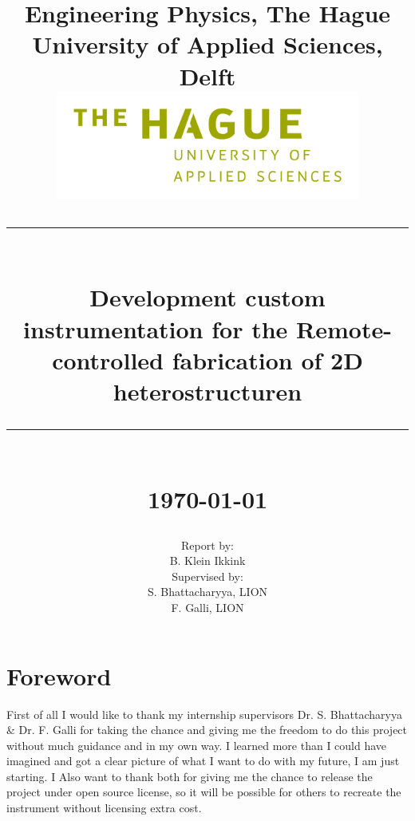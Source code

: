 \documentclass[10pt]{article}
\newcommand{\HRule}[1]{\rule{\linewidth}{#1}}
\begin{document}
\date{}

\title{ \normalsize Engineering Physics, The Hague University of Applied Sciences, Delft
		\\ [1.0cm]
		\includegraphics[width=100mm]{img/misc/hhs_en_groen_hex.png}  %
		\HRule{2pt} \\
		\LARGE \textbf{Development custom instrumentation for the Remote-controlled fabrication of 2D heterostructuren} %
		\HRule{2pt} \\ [0.5cm]
		\normalsize \today \vspace*{5\baselineskip}}
		
\date{}

\author{
        Report by:\\
		B. Klein Ikkink            \\[1cm]
		 Supervised by:        \\
		 S. Bhattacharyya, LION \\
		 F. Galli, LION \\
		 }
		 
\maketitle
{}

\clearpage
\section*{Foreword}
First of all I would like to thank my internship supervisors Dr. S. Bhattacharyya \& Dr. F. Galli for taking the chance and giving me the freedom to do this project without much guidance and in my own way.
I learned more than I could have imagined and got a clear picture of what I want to do with my future, I am just starting.
I Also want to thank both for giving me the chance to release the project under open source license, so it will be possible for others to recreate the instrument without licensing extra cost.\\
\end{document}
